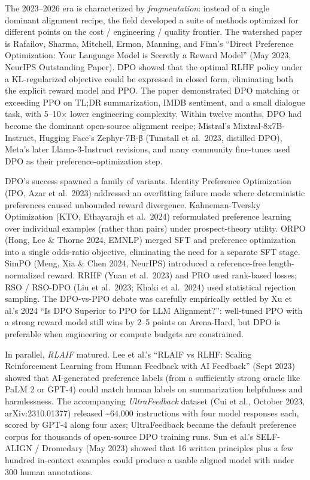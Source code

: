 The 2023--2026 era is characterized by \emph{fragmentation}: instead of a single dominant alignment recipe, the field developed a suite of methods optimized for different points on the cost / engineering / quality frontier. The watershed paper is Rafailov, Sharma, Mitchell, Ermon, Manning, and Finn's ``Direct Preference Optimization: Your Language Model is Secretly a Reward Model'' (May 2023, NeurIPS Outstanding Paper). DPO showed that the optimal RLHF policy under a KL-regularized objective could be expressed in closed form, eliminating both the explicit reward model and PPO. The paper demonstrated DPO matching or exceeding PPO on TL;DR summarization, IMDB sentiment, and a small dialogue task, with 5--10× lower engineering complexity. Within twelve months, DPO had become the dominant open-source alignment recipe; Mistral's Mixtral-8x7B-Instruct, Hugging Face's Zephyr-7B-β (Tunstall et al.~2023, distilled DPO), Meta's later Llama-3-Instruct revisions, and many community fine-tunes used DPO as their preference-optimization step.

DPO's success spawned a family of variants. Identity Preference Optimization (IPO, Azar et al.~2023) addressed an overfitting failure mode where deterministic preferences caused unbounded reward divergence. Kahneman-Tversky Optimization (KTO, Ethayarajh et al.~2024) reformulated preference learning over individual examples (rather than pairs) under prospect-theory utility. ORPO (Hong, Lee \& Thorne 2024, EMNLP) merged SFT and preference optimization into a single odds-ratio objective, eliminating the need for a separate SFT stage. SimPO (Meng, Xia \& Chen 2024, NeurIPS) introduced a reference-free length-normalized reward. RRHF (Yuan et al.~2023) and PRO used rank-based losses; RSO / RSO-DPO (Liu et al.~2023; Khaki et al.~2024) used statistical rejection sampling. The DPO-vs-PPO debate was carefully empirically settled by Xu et al.'s 2024 ``Is DPO Superior to PPO for LLM Alignment?'': well-tuned PPO with a strong reward model still wins by 2--5 points on Arena-Hard, but DPO is preferable when engineering or compute budgets are constrained.

In parallel, \emph{RLAIF} matured. Lee et al.'s ``RLAIF vs RLHF: Scaling Reinforcement Learning from Human Feedback with AI Feedback'' (Sept 2023) showed that AI-generated preference labels (from a sufficiently strong oracle like PaLM 2 or GPT-4) could match human labels on summarization helpfulness and harmlessness. The accompanying \emph{UltraFeedback} dataset (Cui et al., October 2023, arXiv:2310.01377) released \textasciitilde64,000 instructions with four model responses each, scored by GPT-4 along four axes; UltraFeedback became the default preference corpus for thousands of open-source DPO training runs. Sun et al.'s SELF-ALIGN / Dromedary (May 2023) showed that 16 written principles plus a few hundred in-context examples could produce a usable aligned model with under 300 human annotations.

